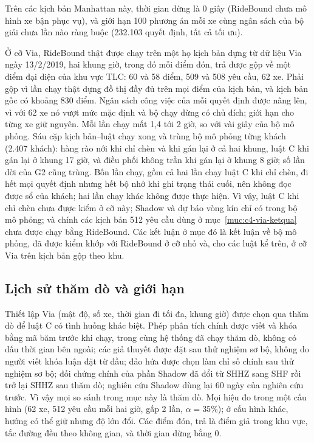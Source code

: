 Trên các kịch bản Manhattan này, thời gian dừng là 0 giây (RideBound chưa mô hình xe bận phục vụ), và giới hạn 100 phương án
mỗi xe cùng ngân sách của bộ giải chưa lần nào ràng buộc (232.103 quyết định, tất cả tối ưu).

Ở cỡ Via, RideBound thật được chạy trên một họ kịch bản dựng từ dữ liệu Via ngày 13/2/2019, hai khung giờ, trong đó mỗi điểm
đón, trả được gộp về một điểm đại diện của khu vực TLC: 60 và 58 điểm, 509 và 508 yêu cầu, 62 xe. Phải gộp vì lần chạy
thật dựng đồ thị đầy đủ trên mọi điểm của kịch bản, và kịch bản gốc có khoảng 830 điểm. Ngân sách công việc của mỗi quyết
định được nâng lên, vì với 62 xe nó vượt mức mặc định và bộ chạy dừng có chủ đích; giới hạn cho từng xe giữ nguyên. Mỗi lần
chạy mất 1,4 tới 2 giờ, so với vài giây của bộ mô phỏng. Sáu cặp kịch bản--luật chạy xong và trùng bộ mô phỏng từng khách
(2.407 khách): hàng rào nới khi chỉ chèn và khi gán lại ở cả hai khung, luật C khi gán lại ở khung 17 giờ, và điều phối
không trần khi gán lại ở khung 8 giờ; số lần dời của G2 cũng trùng. Bốn lần chạy, gồm cả hai lần chạy luật C khi chỉ chèn,
đi hết mọi quyết định nhưng hết bộ nhớ khi ghi trạng thái cuối, nên không đọc được sổ của khách; hai lần chạy khác không được
thực hiện. Vì vậy, luật C khi chỉ chèn chưa được kiểm ở cỡ này; Shadow và dự báo vòng kín chỉ có trong bộ mô phỏng; và chính
các kịch bản 512 yêu cầu dùng ở mục~\ref{muc:c4-via-ketqua} chưa được chạy bằng RideBound. Các kết luận ở mục đó là kết luận
về bộ mô phỏng, đã được kiểm khớp với RideBound ở cỡ nhỏ và, cho các luật kể trên, ở cỡ Via trên kịch bản gộp theo khu.

\subsection{Lịch sử thăm dò và giới hạn}
\label{muc:c4-via-gioihan}

Thiết lập Via (mật độ, số xe, thời gian đi tối đa, khung giờ) được chọn qua thăm dò để luật C có tình huống khác biệt.
Phép phân tích chính được viết và khóa bằng mã băm trước khi chạy, trong cùng hệ thống đã chạy thăm dò, không có dấu thời gian
bên ngoài; các giả thuyết được đặt sau thử nghiệm sơ bộ, không do người viết khóa luận đặt từ đầu; đảo hứa được chọn làm chỉ
số chính sau thử nghiệm sơ bộ; đối chứng chính của phần Shadow đã đổi từ SHHZ sang SHF rồi trở lại SHHZ sau thăm dò; nghiên
cứu Shadow dùng lại 60 ngày của nghiên cứu trước. Vì vậy mọi so sánh trong mục này là thăm dò. Mọi hiệu đo trong một cấu
hình (62 xe, 512 yêu cầu mỗi hai giờ, gấp 2 lần, $\alpha = 35\%$); ở cấu hình khác, hướng có thể giữ nhưng độ lớn đổi. Các
điểm đón, trả là điểm giả trong khu vực, tắc đường đều theo không gian, và thời gian dừng bằng 0.

